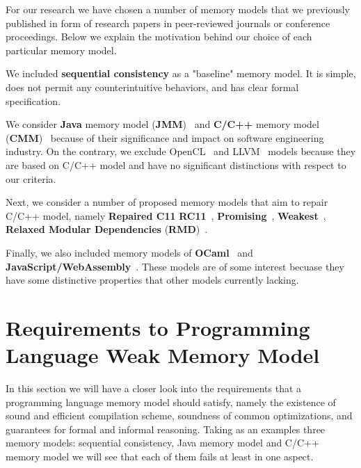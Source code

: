 \documentclass[a4paper,twoside,11pt]{article}
\numberwithin{equation}{section}
\begin{document}
For our research we have chosen a number of memory models 
that we previously published 
in form of research papers in peer-reviewed journals or conference proceedings. 
Below we explain the motivation behind our choice of each particular memory model.  

We included \textbf{sequential consistency} as a "baseline" memory model. 
It is simple, does not permit any counterintuitive behaviors,
and has clear formal specification.

We consider \textbf{Java} memory model (\textbf{JMM})~\cite{Manson-al:POPL05}
and \textbf{C/C++} memory model (\textbf{CMM})~\cite{Boehm-Adve:PLDI08, Batty-al:POPL11}
because of their significance and impact on software engineering industry.
On the contrary, we exclude OpenCL~\cite{Batty-el:POPL16} and LLVM~\cite{Chakraborty-Vafeiadis:CGO17}
models because they are based on C/C++ model and have no significant distinctions
with respect to our criteria.

Next, we consider a number of proposed memory models 
that aim to repair C/C++ model, namely 
\textbf{Repaired C11} \textbf{RC11}~\cite{Lahav-al:PLDI17}, 
\textbf{Promising}~\cite{Kang-al:POPL17, Lee-el:PLDI20}, 
\textbf{Weakest}~\cite{Chakraborty-Vafeiadis:POPL19}, 
\textbf{Relaxed Modular Dependencies} (\textbf{RMD})~\cite{Paviotti-el:ESOP20}.

Finally, we also included memory models of \textbf{OCaml}~\cite{Dolan-al:PLDI18}
and \textbf{JavaScript/WebAssembly}~\cite{Watt-el:PLDI2020}.
These models are of some interest becuase 
they have some distinctive properties
that other models currently lacking.

\section{Requirements to Programming Language Weak Memory Model}

In this section we will have a closer look into the requirements 
that a programming language memory model should satisfy, 
namely the existence of sound and efficient compilation scheme, 
soundness of common optimizations, and guarantees for formal and informal reasoning.  
Taking as an examples three memory models: 
sequential consistency, Java memory model and C/C++ memory model
we will see that each of them fails at least in one aspect.
\end{document}
